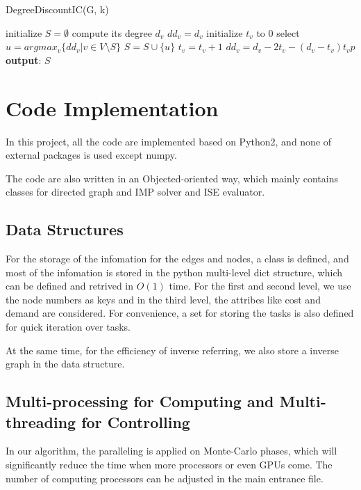 \documentclass[journal,twoside,web]{ieeecolor}
\begin{document}
\begin{algorithm}
\caption{DegreeDiscountIC(G, k)}
\label{algorithm:ddh}
\begin{algorithmic} [1]
\STATE initialize $S = \emptyset$
\STATE compute its degree $d_v$
\STATE $dd_v = d_v$
\STATE initialize $t_v$ to $0$
\ENDFOR
{}
\STATE select $u=argmax_v\{dd_v | v \in V \setminus S\}$
\STATE $S=S\cup \{ u \}$
\STATE $t_v = t_v +1$
\STATE $dd_v = d_v -2t_v-(d_v-t_v)t_vp$
\ENDFOR
\ENDFOR
\STATE \textbf{output}: $S$
\end{algorithmic}
\end{algorithm}

\section{Code Implementation}
In this project, all the code are implemented based on Python2, and none of external packages is used except numpy. \par

The code are also written in an Objected-oriented way, which mainly contains classes for directed graph and IMP solver and ISE evaluator.
\\
\subsection{Data Structures}
For the storage of the infomation for the edges and nodes, a class is defined, and most of the infomation is stored in the python multi-level dict structure, which can be defined and retrived in $O(1)$ time. For the first and second level, we use the node numbers as keys and in the third level, the attribes like cost and demand are considered. For convenience, a set for storing the tasks is also defined for quick iteration over tasks.\par
At the same time, for the efficiency of inverse referring, we also store a inverse graph in the data structure.

\subsection{Multi-processing for Computing and Multi-threading for Controlling}
In our algorithm, the paralleling is applied on Monte-Carlo phases, which will significantly reduce the time when more processors or even GPUs come. The number of computing processors can be adjusted in the main entrance file.
\end{document}
